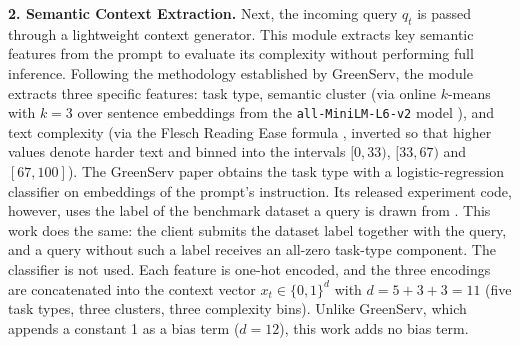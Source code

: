 \textbf{2. Semantic Context Extraction.}
Next, the incoming query $q_t$ is passed through a lightweight context generator.
This module extracts key semantic features from the prompt to evaluate its complexity without performing full inference.
Following the methodology established by GreenServ, the module extracts three specific features: task type, semantic cluster (via online $k$-means with $k = 3$ over sentence embeddings from the \texttt{all-MiniLM-L6-v2} model \cite{sbert}), and text complexity (via the Flesch Reading Ease formula \cite{flesch}, inverted so that higher values denote harder text and binned into the intervals $[0, 33)$, $[33, 67)$ and $[67, 100]$).
The GreenServ paper obtains the task type with a logistic-regression classifier on embeddings of the prompt's instruction.
Its released experiment code, however, uses the label of the benchmark dataset a query is drawn from \cite{greenserv_code}.
This work does the same: the client submits the dataset label together with the query, and a query without such a label receives an all-zero task-type component.
The classifier is not used.
Each feature is one-hot encoded, and the three encodings are concatenated into the context vector $x_t \in \{0, 1\}^d$ with $d = 5 + 3 + 3 = 11$ (five task types, three clusters, three complexity bins).
Unlike GreenServ, which appends a constant 1 as a bias term ($d = 12$), this work adds no bias term.

